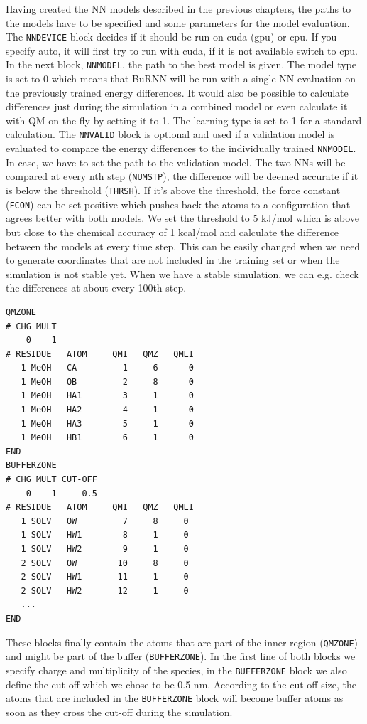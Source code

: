 Having created the NN models described in the previous chapters, the paths to the models have to be specified and some parameters for the model evaluation. The \texttt{NNDEVICE} block decides if it should be run on cuda (gpu) or cpu. If you specify auto, it will first try to run with cuda, if it is not available switch to cpu. 
In the next block, \texttt{NNMODEL}, the path to the best model is given. The model type is set to 0 which means that BuRNN will be run with a single NN evaluation on the previously trained energy differences. It would also be possible to calculate differences just during the simulation in a combined model or even calculate it with QM on the fly by setting it to 1. The learning type is set to 1 for a standard calculation. 
The \texttt{NNVALID} block is optional and used if a validation model is evaluated to compare the energy differences to the individually trained \texttt{NNMODEL}. In case, we have to set the path to the validation model. The two NNs will be compared at every nth step (\texttt{NUMSTP}), the difference will be deemed accurate if it is below the threshold (\texttt{THRSH}). If it’s above the threshold, the force constant (\texttt{FCON}) can be set positive which pushes back the atoms to a configuration that agrees better with both models. 
We set the threshold to 5 kJ/mol which is above but close to the chemical accuracy of 1 kcal/mol and calculate the difference between the models at every time step. This can be easily changed when we need to generate coordinates that are not included in the training set or when the simulation is not stable yet. When we have a stable simulation, we can e.g. check the differences at about every 100th step.

\begin{lstlisting}[breaklines=true, breakatwhitespace=false]
QMZONE
# CHG MULT
    0    1
# RESIDUE   ATOM     QMI   QMZ   QMLI
   1 MeOH   CA         1     6      0
   1 MeOH   OB         2     8      0
   1 MeOH   HA1        3     1      0
   1 MeOH   HA2        4     1      0
   1 MeOH   HA3        5     1      0
   1 MeOH   HB1        6     1      0
END
BUFFERZONE
# CHG MULT CUT-OFF 
    0    1     0.5
# RESIDUE   ATOM     QMI   QMZ   QMLI
   1 SOLV   OW         7     8     0
   1 SOLV   HW1        8     1     0
   1 SOLV   HW2        9     1     0
   2 SOLV   OW        10     8     0
   2 SOLV   HW1       11     1     0
   2 SOLV   HW2       12     1     0
   ...
END
\end{lstlisting}

These blocks finally contain the atoms that are part of the inner region (\texttt{QMZONE}) and might be part of the buffer (\texttt{BUFFERZONE}). In the first line of both blocks we specify charge and multiplicity of the species, in the \texttt{BUFFERZONE} block we also define the cut-off which we chose to be 0.5 nm. According to the cut-off size, the atoms that are included in the \texttt{BUFFERZONE} block will become buffer atoms as soon as they cross the cut-off during the simulation.

